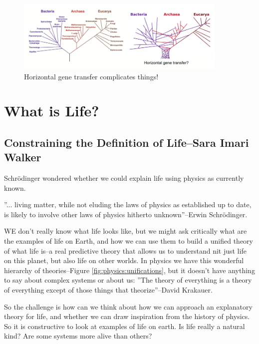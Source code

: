 \documentclass[]{article}
\begin{document}
\begin{figure}[H]
	\caption{Horizontal gene transfer complicates things!}\label{fig:PhylogenyHorizontal} 
	\includegraphics[width=0.9\textwidth]{PhylogenyHorizontal}
\end{figure}



\section{What is Life?}

\subsection[Constraining the Definition of Life]{Constraining the Definition of Life--Sara Imari Walker}

Schrödinger wondered whether we could explain life using physics as currently known.

''... living matter, while not eluding the laws of physics as established up to date, is likely to involve other laws of physics hitherto unknown''--Erwin Schrödinger\cite{schrodinger1944life}.

WE don't really know what life looks like, but we might ask critically what are the examples of life on Earth, and how we can use them to build a unified theory of what life is--a real predictive theory that allows us to understand nit just life on this planet, but also life on other worlds. In physics we have this wonderful hierarchy of theories--Figure \ref{fig:physics:unifications}, but it doesn't have anything to say about complex systems or about us: ''The theory of everything is a theory of everything except of those things that theorize''--David Krakauer.

So the challenge is how can we think about how we can approach an explanatory theory for life, and whether we can draw inspiration from the history of physics. So it is constructive to look at examples of life on earth. Is life really a natural kind? Are some systems more alive than others?
\end{document}
